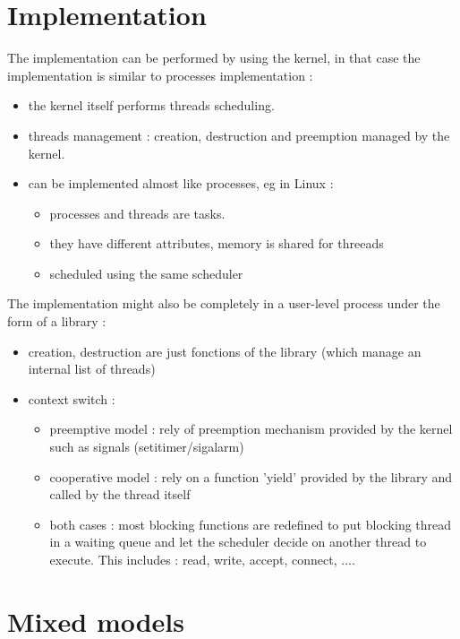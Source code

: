 \documentclass[a4paper,10pt]{article}
\begin{document}
\section{Implementation}

The implementation can be performed by using the kernel, in that case the implementation
is similar to processes implementation :

\begin{itemize}
\item the kernel itself performs threads scheduling.
\item threads management : creation, destruction and preemption managed by the kernel.
\item can be implemented almost like processes, eg in Linux :
\begin{itemize}
\item processes and threads are tasks.
\item they have different attributes, memory is shared for threeads
\item scheduled using the same scheduler
\end{itemize}
\end{itemize}

The implementation might also be completely in a user-level process under the form of a library :

\begin{itemize}
\item creation, destruction are just fonctions of the library (which manage an internal list of threads)
\item context switch :
\begin{itemize}
\item preemptive model : rely of preemption mechanism provided by  the kernel such as signals (setitimer/sigalarm)
\item cooperative model : rely on a function 'yield' provided by the library and called by the thread itself
\item both cases : most blocking functions are redefined to put blocking thread in a waiting queue and let the scheduler decide on another thread to execute. This includes : read, write, accept, connect, ....
\end{itemize}
\end{itemize}



\section{Mixed models}
\end{document}
